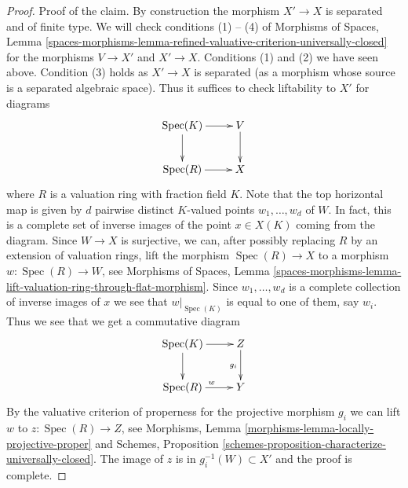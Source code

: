 \documentclass[10pt,a4paper]{amsart}
\theoremstyle{plain}
\theoremstyle{definition}
\theoremstyle{remark}
\numberwithin{equation}{subsection}
\def\Spec{\mathop{\mathrm{Spec}}}
\begin{document}
\begin{proof}
\medskip\noindent
Proof of the claim. By construction the morphism $X' \to X$ is separated
and of finite type. We will check conditions (1) -- (4) of
Morphisms of Spaces, Lemma
\ref{spaces-morphisms-lemma-refined-valuative-criterion-universally-closed}
for the morphisms $V \to X'$ and $X' \to X$.
Conditions (1) and (2) we have seen above.
Condition (3) holds as $X' \to X$ is separated (as a morphism whose
source is a separated algebraic space). Thus it suffices to check
liftability to $X'$ for diagrams
$$
\xymatrix{
\Spec(K) \ar[r] \ar[d] & V \ar[d] \\
\Spec(R) \ar[r] & X
}
$$
where $R$ is a valuation ring with fraction field $K$.
Note that the top horizontal map is given by $d$ pairwise distinct
$K$-valued points $w_1, \ldots, w_d$ of $W$. In fact, this
is a complete set of inverse images of the point $x \in X(K)$
coming from the diagram. Since $W \to X$ is surjective,
we can, after possibly replacing $R$ by an extension of valuation rings,
lift the morphism $\Spec(R) \to X$ to a morphism $w : \Spec(R) \to W$, see
Morphisms of Spaces, Lemma
\ref{spaces-morphisms-lemma-lift-valuation-ring-through-flat-morphism}.
Since $w_1, \ldots, w_d$ is a complete collection of inverse images of
$x$ we see that $w|_{\Spec(K)}$ is equal to one of them, say $w_i$.
Thus we see that we get a commutative diagram
$$
\xymatrix{
\Spec(K) \ar[r] \ar[d] &  Z \ar[d]_{g_i}\\
\Spec(R) \ar[r]^w & Y
}
$$
By the valuative criterion of properness for the projective
morphism $g_i$ we can lift $w$ to $z : \Spec(R) \to Z$, see
Morphisms, Lemma \ref{morphisms-lemma-locally-projective-proper}
and
Schemes, Proposition \ref{schemes-proposition-characterize-universally-closed}.
The image of $z$ is in $g_i^{-1}(W) \subset X'$ and the proof is complete.
\end{proof}



\end{document}
